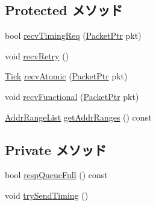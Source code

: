 \subsection*{Protected メソッド}
\begin{DoxyCompactItemize}
\item 
bool \hyperlink{classBridge_1_1BridgeSlavePort_a3344d9dd0f83257feab5424e761f31c6}{recvTimingReq} (\hyperlink{classPacket}{PacketPtr} pkt)
\item 
void \hyperlink{classBridge_1_1BridgeSlavePort_a29cb5a4f98063ce6e9210eacbdb35298}{recvRetry} ()
\item 
\hyperlink{base_2types_8hh_a5c8ed81b7d238c9083e1037ba6d61643}{Tick} \hyperlink{classBridge_1_1BridgeSlavePort_a5f0b4c4a94f6b0053f9d7a4eb9c2518a}{recvAtomic} (\hyperlink{classPacket}{PacketPtr} pkt)
\item 
void \hyperlink{classBridge_1_1BridgeSlavePort_aeefa907fb6d6a787e6dab90e8138ea90}{recvFunctional} (\hyperlink{classPacket}{PacketPtr} pkt)
\item 
\hyperlink{classstd_1_1list}{AddrRangeList} \hyperlink{classBridge_1_1BridgeSlavePort_a36cf113d5e5e091ebddb32306c098fae}{getAddrRanges} () const 
\end{DoxyCompactItemize}
\subsection*{Private メソッド}
\begin{DoxyCompactItemize}
\item 
bool \hyperlink{classBridge_1_1BridgeSlavePort_a7ca559cfc6bcef8eba87fc5a0bd0bb42}{respQueueFull} () const 
\item 
void \hyperlink{classBridge_1_1BridgeSlavePort_a391c414b53eb45782e37bc539608e477}{trySendTiming} ()
\end{DoxyCompactItemize}
